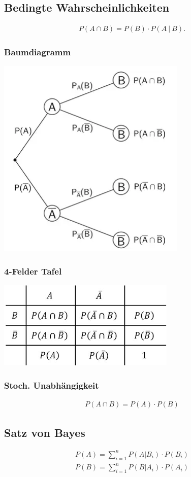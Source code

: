 \documentclass[10pt,a4paper]{article}
\begin{document}
  \subsection{Bedingte Wahrscheinlichkeiten}
  \begin{mdframed}[style=exercise]
    \begin{align}
    P (A \cap B) = P (B) \cdot P (A\ |\ B).
    \end{align}
  \end{mdframed}

  \subsubsection{Baumdiagramm}
  \begin{center}
      \includegraphics[width=.22\textwidth]{./img/baum.png}
  \end{center}
  \subsubsection{4-Felder Tafel}
  \begin{center}
      \includegraphics[width=.22\textwidth]{./img/vier.png}
  \end{center}

  \subsubsection{Stoch. Unabhängigkeit}
  \begin{mdframed}[style=exercise]
    \begin{align}
        P (A \cap B) = P(A) \cdot P(B)
    \end{align}
  \end{mdframed}

  \subsection{Satz von Bayes}
  \begin{mdframed}[style=exercise]
    \begin{align}
        P(A) = \displaystyle\sum_{i=1}^{n} P(A|B_i) \cdot P(B_i) \\
        P(B) = \displaystyle\sum_{i=1}^{n} P(B|A_i) \cdot P(A_i)
    \end{align}
  \end{mdframed}
\end{document}
